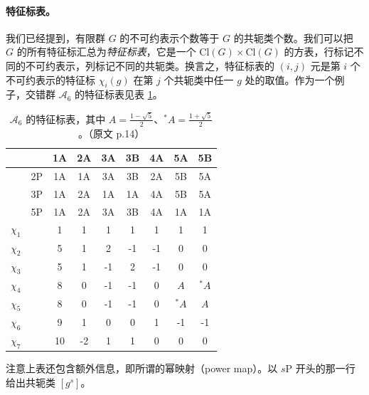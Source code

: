\documentclass[11pt,a4paper,fontset=windows]{ctexart}
\numberwithin{equation}{section}
\newcommand{\myparagraph}[1]{\paragraph{#1}\mbox\\}
\newcommand{\Cl}{\text{Cl}}
\def\x{\chi}
\begin{document}


\myparagraph{特征标表。}
我们已经提到，有限群 $G$ 的不可约表示个数等于 $G$ 的共轭类个数。我们可以把 $G$ 的所有特征标汇总为\emph{特征标表}，它是一个 $\Cl(G)\times\Cl(G)$ 的方表，行标记不同的不可约表示，列标记不同的共轭类。换言之，特征标表的 $(i,j)$ 元是第 $i$ 个不可约表示的特征标 $\x_i(g)$ 在第 $j$ 个共轭类中任一 $g$ 处的取值。作为一个例子，交错群 $\mathcal{A}_6$ 的特征标表见表 \ref{tbl:char_table_ex}。
\begin{table}
\centering
\begin{tabular}{|c|c|c|c|c|c|c|c|c|}
\hline    &    & 1A & 2A & 3A & 3B & 4A & 5A & 5B \\ \hline \hline
          & 2P & 1A & 1A & 3A & 3B & 2A & 5B & 5A \\ \hline
          & 3P & 1A & 2A & 1A & 1A & 4A & 5B & 5A \\ \hline
          & 5P & 1A & 2A & 3A & 3B & 4A & 1A & 1A \\ \hline  \hline
$\x_1$    &    &  1 &  1 &  1 &  1 & 1 & 1 & 1 \\ \hline
$\x_2$    &    &  5 &  1 &  2 & -1 &-1 & 0 & 0 \\ \hline
$\x_3$    &    &  5 &  1 & -1 &  2 &-1 & 0 & 0 \\ \hline
$\x_4$    &    &  8 &  0 & -1 & -1 & 0 &$A$& $^*A$ \\ \hline
$\x_5$    &    &  8 &  0 & -1 & -1 & 0 &$^*A$& $A$ \\ \hline
$\x_6$    &    &  9 &  1 &  0 &  0 & 1 &-1 &-1 \\ \hline
$\x_7$    &    & 10 & -2 &  1 &  1 & 0 & 0 & 0 \\ \hline
\end{tabular}
\caption{$\mathcal{A}_6$ 的特征标表，其中 $A=\frac{1-\sqrt{5}}{2}$、$^*A=\frac{1+\sqrt{5}}{2}$。（原文 p.14）}
\label{tbl:char_table_ex}
\end{table}
注意上表还包含额外信息，即所谓的幂映射（power map）。以 $s$P 开头的那一行给出共轭类 $[g^s]$。
\end{document}

